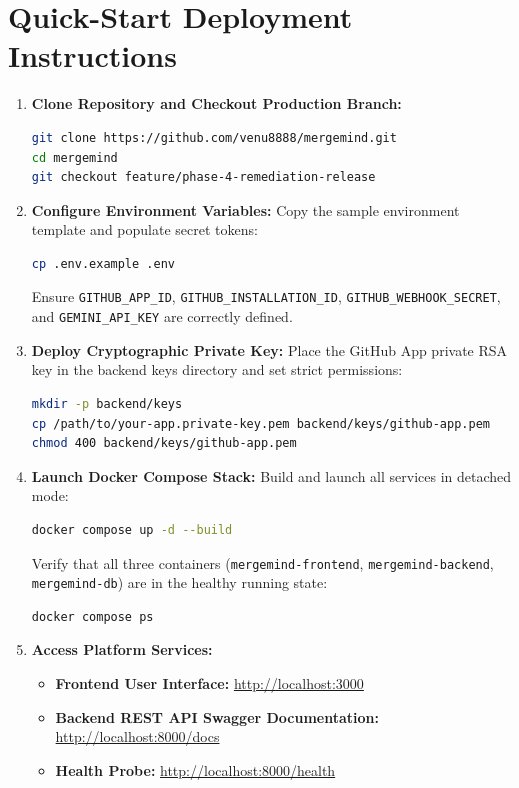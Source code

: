 \documentclass[12pt,a4paper,oneside]{report}
\begin{document}
\section{Quick-Start Deployment Instructions}

\begin{enumerate}
    \item \textbf{Clone Repository and Checkout Production Branch:}
    \begin{lstlisting}[language=bash]
git clone https://github.com/venu8888/mergemind.git
cd mergemind
git checkout feature/phase-4-remediation-release
    \end{lstlisting}

    \item \textbf{Configure Environment Variables:}
    Copy the sample environment template and populate secret tokens:
    \begin{lstlisting}[language=bash]
cp .env.example .env
    \end{lstlisting}
    Ensure \texttt{GITHUB\_APP\_ID}, \texttt{GITHUB\_INSTALLATION\_ID}, \texttt{GITHUB\_WEBHOOK\_SECRET}, and \texttt{GEMINI\_API\_KEY} are correctly defined.

    \item \textbf{Deploy Cryptographic Private Key:}
    Place the GitHub App private RSA key in the backend keys directory and set strict permissions:
    \begin{lstlisting}[language=bash]
mkdir -p backend/keys
cp /path/to/your-app.private-key.pem backend/keys/github-app.pem
chmod 400 backend/keys/github-app.pem
    \end{lstlisting}

    \item \textbf{Launch Docker Compose Stack:}
    Build and launch all services in detached mode:
    \begin{lstlisting}[language=bash]
docker compose up -d --build
    \end{lstlisting}
    Verify that all three containers (\texttt{mergemind-frontend}, \texttt{mergemind-backend}, \texttt{mergemind-db}) are in the healthy running state:
    \begin{lstlisting}[language=bash]
docker compose ps
    \end{lstlisting}

    \item \textbf{Access Platform Services:}
    \begin{itemize}
        \item \textbf{Frontend User Interface:} \url{http://localhost:3000}
        \item \textbf{Backend REST API Swagger Documentation:} \url{http://localhost:8000/docs}
        \item \textbf{Health Probe:} \url{http://localhost:8000/health}
    \end{itemize}
\end{enumerate}
\end{document}
